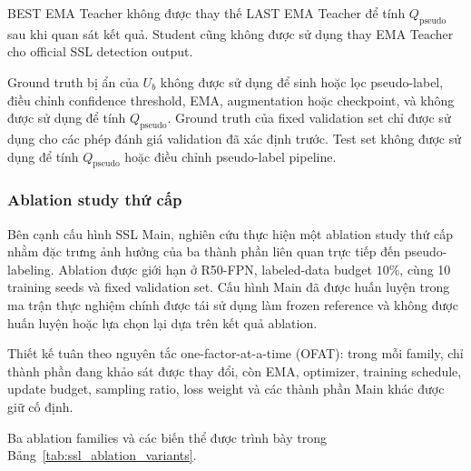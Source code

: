 \documentclass[pdflatex,sn-mathphys-num]{sn-jnl}%
\theoremstyle{thmstyleone}%
\theoremstyle{thmstyletwo}%
\theoremstyle{thmstylethree}%
\begin{document}
BEST EMA Teacher không được thay thế LAST EMA Teacher để tính
\(Q_{\mathrm{pseudo}}\) sau khi quan sát kết quả. Student cũng không được sử
dụng thay EMA Teacher cho official SSL detection output.

Ground truth bị ẩn của \(U_b\) không được sử dụng để sinh hoặc lọc
pseudo-label, điều chỉnh confidence threshold, EMA, augmentation hoặc
checkpoint, và không được sử dụng để tính \(Q_{\mathrm{pseudo}}\).
Ground truth của fixed validation set chỉ được sử dụng cho các phép đánh giá
validation đã xác định trước. Test set không được sử dụng để tính
\(Q_{\mathrm{pseudo}}\) hoặc điều chỉnh pseudo-label pipeline.

\subsubsection{Ablation study thứ cấp}
\label{subsubsec:ablation_design}

Bên cạnh cấu hình SSL Main, nghiên cứu thực hiện một ablation study thứ cấp
nhằm đặc trưng ảnh hưởng của ba thành phần liên quan trực tiếp đến
pseudo-labeling. Ablation được giới hạn ở R50-FPN, labeled-data budget
\(10\%\), cùng 10 training seeds và fixed validation set. Cấu hình Main đã
được huấn luyện trong ma trận thực nghiệm chính được tái sử dụng làm frozen
reference và không được huấn luyện hoặc lựa chọn lại dựa trên kết quả
ablation.

Thiết kế tuân theo nguyên tắc one-factor-at-a-time (OFAT): trong mỗi family,
chỉ thành phần đang khảo sát được thay đổi, còn EMA, optimizer, training
schedule, update budget, sampling ratio, loss weight và các thành phần Main
khác được giữ cố định.

Ba ablation families và các biến thể được trình bày trong
Bảng~\ref{tab:ssl_ablation_variants}.
\end{document}
